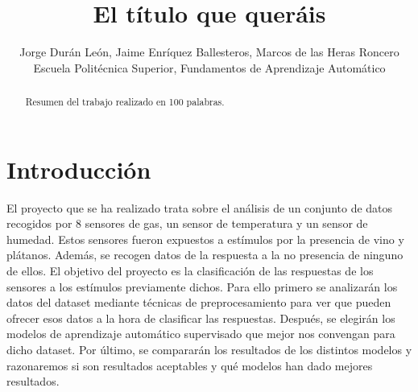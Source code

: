 \documentclass{esannV2}
\begin{document}
\title{El título que queráis}

\author{Jorge Durán León, Jaime Enríquez Ballesteros, Marcos de las Heras Roncero
%
%
\vspace{.3cm}\\
%
  Escuela Politécnica Superior, Fundamentos de Aprendizaje Automático \\
%
}

\maketitle

\begin{abstract}
Resumen del trabajo realizado en 100 palabras.
\end{abstract}

\section{Introducción}

El proyecto que se ha realizado trata sobre el análisis de un conjunto de datos recogidos por 8 sensores de gas, un sensor de temperatura y un sensor de humedad. Estos sensores fueron expuestos a estímulos por la presencia de vino y plátanos. Además, se recogen datos de la respuesta a la no presencia de ninguno de ellos. El objetivo del proyecto es la clasificación de las respuestas de los sensores a los estímulos previamente dichos. Para ello primero se analizarán los datos del dataset mediante técnicas de preprocesamiento para ver que pueden ofrecer esos datos a la hora de clasificar las respuestas. Después, se elegirán los modelos de aprendizaje automático supervisado que mejor nos convengan para dicho dataset. Por último, se compararán los resultados de los distintos modelos y razonaremos si son resultados aceptables y qué modelos han dado mejores resultados.
\end{document}
